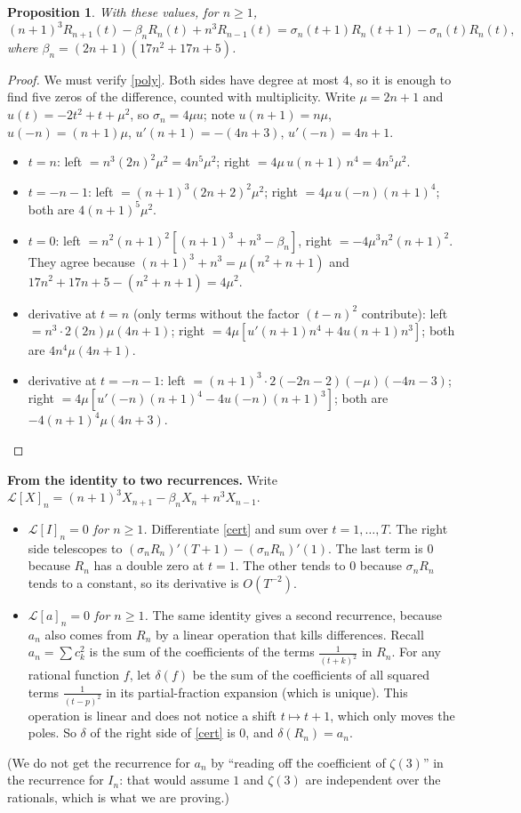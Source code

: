 \documentclass[11pt]{article}
\newtheorem{proposition}[lemma]{Proposition}
\theoremstyle{remark}
\newcommand{\q}[1]{\medskip\noindent\textbf{#1}}
\begin{document}
\begin{proposition}\label{prop:cert}
With these values, for $n\ge1$,
\begin{equation}\label{cert}
(n+1)^3R_{n+1}(t)-\beta_nR_n(t)+n^3R_{n-1}(t)=\sigma_n(t+1)R_n(t+1)-\sigma_n(t)R_n(t),
\end{equation}
where $\beta_n=(2n+1)(17n^2+17n+5)$.
\end{proposition}
\begin{proof}
We must verify \eqref{poly}. Both sides have degree at most $4$, so it is enough to find five zeros
of the difference, counted with multiplicity. Write $\mu=2n+1$ and $u(t)=-2t^2+t+\mu^2$, so
$\sigma_n=4\mu u$; note $u(n+1)=n\mu$, $u(-n)=(n+1)\mu$, $u'(n+1)=-(4n+3)$, $u'(-n)=4n+1$.
\begin{itemize}
\item $t=n$: left $=n^3(2n)^2\mu^2=4n^5\mu^2$; right $=4\mu\,u(n+1)\,n^4=4n^5\mu^2$.
\item $t=-n-1$: left $=(n+1)^3(2n+2)^2\mu^2$; right $=4\mu\,u(-n)(n+1)^4$; both are
$4(n+1)^5\mu^2$.
\item $t=0$: left $=n^2(n+1)^2[(n+1)^3+n^3-\beta_n]$, right $=-4\mu^3n^2(n+1)^2$. They agree because
$(n+1)^3+n^3=\mu(n^2+n+1)$ and $17n^2+17n+5-(n^2+n+1)=4\mu^2$.
\item derivative at $t=n$ (only terms without the factor $(t-n)^2$ contribute): left
$=n^3\cdot2(2n)\mu(4n+1)$; right $=4\mu[u'(n+1)n^4+4u(n+1)n^3]$; both are $4n^4\mu(4n+1)$.
\item derivative at $t=-n-1$: left $=(n+1)^3\cdot2(-2n-2)(-\mu)(-4n-3)$; right
$=4\mu[u'(-n)(n+1)^4-4u(-n)(n+1)^3]$; both are $-4(n+1)^4\mu(4n+3)$.\qedhere
\end{itemize}
\end{proof}

\q{From the identity to two recurrences.} Write
$\mathcal L[X]_n=(n+1)^3X_{n+1}-\beta_nX_n+n^3X_{n-1}$.
\begin{itemize}
\item \emph{$\mathcal L[I]_n=0$ for $n\ge1$.} Differentiate \eqref{cert} and sum over
$t=1,\dots,T$. The right side telescopes to $(\sigma_nR_n)'(T+1)-(\sigma_nR_n)'(1)$. The last term is $0$
because $R_n$ has a double zero at $t=1$. The other tends to $0$ because $\sigma_nR_n$ tends to a
constant, so its derivative is $O(T^{-2})$.
\item \emph{$\mathcal L[a]_n=0$ for $n\ge1$.} The same identity gives a second recurrence,
because $a_n$ also comes from $R_n$ by a linear operation that kills differences. Recall $a_n=\sum c_k^2$ is the sum of the
coefficients of the terms $\frac1{(t+k)^2}$ in $R_n$. For any rational function $f$, let
$\delta(f)$ be the sum of the coefficients of all squared terms $\frac1{(t-p)^2}$ in its
partial-fraction expansion (which is unique). This
operation is linear and does not notice a shift $t\mapsto t+1$, which only moves the poles. So
$\delta$ of the right side of \eqref{cert} is $0$, and $\delta(R_n)=a_n$.
\end{itemize}
(We do not get the recurrence for $a_n$ by ``reading off the coefficient of $\zeta(3)$'' in the
recurrence for $I_n$: that would assume $1$ and $\zeta(3)$ are independent over the rationals,
which is what we are proving.)
\end{document}
